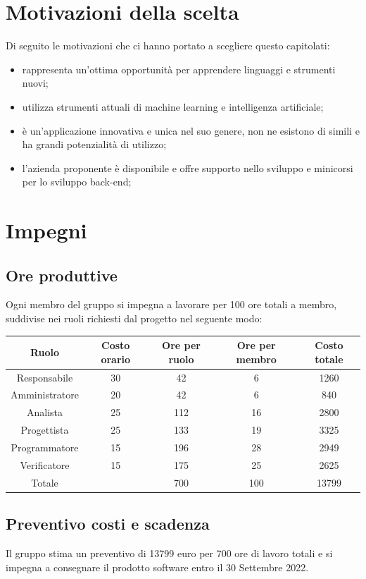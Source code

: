 \documentclass[12pt,a4paper]{article}
\begin{document}
\section{Motivazioni della scelta}
Di seguito le motivazioni che ci hanno portato a scegliere questo capitolati:
	\begin{itemize}
		\item rappresenta un'ottima opportunità per apprendere linguaggi e strumenti nuovi;
		\item utilizza strumenti attuali di machine learning e intelligenza artificiale;
		\item è un'applicazione innovativa e unica nel suo genere, non ne esistono di simili e ha grandi potenzialità di utilizzo;
		\item l'azienda proponente è disponibile e offre supporto nello sviluppo e minicorsi per lo sviluppo back-end;
	\end{itemize}
\section{Impegni}

	\subsection{Ore produttive}
	Ogni membro del gruppo si impegna a lavorare per 100 ore totali a membro, suddivise nei ruoli richiesti dal progetto nel seguente modo: 
		\begin{center}
			\begin{tabular}{||c | c | c | c | c||} 
			 \hline
			 Ruolo & Costo orario  & Ore per ruolo & Ore per membro & Costo totale \\ [0.5ex] 
			 \hline\hline
			 Responsabile & 30 & 42 & 6 & 1260 \\ 
			 \hline
			 Amministratore & 20 & 42 & 6 & 840 \\
			 \hline
			 Analista & 25 & 112 & 16 & 2800 \\
			 \hline
			 Progettista & 25 & 133 & 19 & 3325 \\
			 \hline
			 Programmatore & 15 & 196 & 28 & 2949 \\
			 \hline
			 Verificatore & 15 & 175 & 25 & 2625 \\
			 \hline\hline
			 Totale &  & 700 & 100 & 13799 \\
			 \hline
			\end{tabular}
		\end{center}

\subsection{Preventivo costi e scadenza}
Il gruppo stima un preventivo di 13799 euro per 700 ore di lavoro totali e si impegna a consegnare il prodotto software entro il 30 Settembre 2022.
\end{document}
